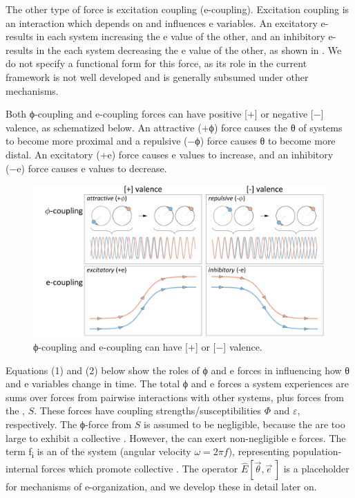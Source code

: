  The other type of force is excitation coupling (e-coupling). Excitation coupling is an interaction which depends on and influences e variables. An excitatory e- results in each system increasing the e value of the other, and an inhibitory e- results in the each system decreasing the e value of the other, as shown in {}. We do not specify a functional form for this force, as its role in the current framework is not well developed and is generally subsumed under other mechanisms.

  Both ϕ-coupling and e-coupling forces can have positive [+] or negative [−] valence, as schematized below. An attractive (+ϕ) force causes the θ of systems to become more proximal and a repulsive (−ϕ) force causes θ to become more distal. An excitatory (+e) force causes e values to increase, and an inhibitory (−e) force causes e values to decrease. 

  
\begin{figure}
\includegraphics[width=\textwidth]{figures/Tilsen-img20.png}
\caption{ϕ-coupling and e-coupling can have [+] or [−] valence.}
\label{fig:2:13}
\end{figure}
 

  Equations (1) and (2) below show the roles of ϕ and e forces in influencing how θ and e variables change in time. The total ϕ and e forces a system experiences are sums over forces from pairwise interactions with other systems, plus forces from the , $S$. These forces have coupling strengths/susceptibilities $\Phi$ and $\varepsilon $, respectively. The ϕ-force from $S$ is assumed to be negligible, because the  are too large to exhibit a collective . However, the  can exert non-negligible e forces. The term f\textsubscript{i} is an  of the system (angular velocity $ω = 2πf$), representing population-internal forces which promote collective . The operator  $\widehat{E}[\overrightarrow{\theta} ,\overrightarrow{e}\,]$ is a placeholder for mechanisms of e-organization, and we develop these in detail later on.

